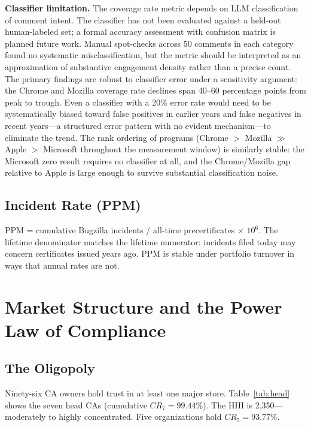 \documentclass[10pt,twocolumn,letterpaper]{article}
\begin{document}
\noindent\textbf{Classifier limitation.} The coverage rate metric
depends on LLM classification of comment intent. The classifier has
not been evaluated against a held-out human-labeled set; a formal
accuracy assessment with confusion matrix is planned future work.
Manual spot-checks across 50 comments in each category found no
systematic misclassification, but the metric should be interpreted
as an approximation of substantive engagement density rather than
a precise count. The primary findings are robust to classifier
error under a sensitivity argument: the Chrome and Mozilla coverage
rate declines span 40--60 percentage points from peak to trough.
Even a classifier with a 20\% error rate would need to be
systematically biased toward false positives in earlier years and
false negatives in recent years---a structured error pattern with
no evident mechanism---to eliminate the trend. The rank ordering
of programs (Chrome $>$ Mozilla $\gg$ Apple $>$ Microsoft throughout
the measurement window) is similarly stable: the Microsoft zero
result requires no classifier at all, and the Chrome/Mozilla gap
relative to Apple is large enough to survive substantial
classification noise.

\subsection{Incident Rate (PPM)}
PPM = cumulative Bugzilla incidents / all-time precertificates
$\times$ $10^6$. The lifetime denominator matches the lifetime numerator:
incidents filed today may concern certificates issued years ago. PPM
is stable under portfolio turnover in ways that annual rates are not.

\section{Market Structure and the Power Law of Compliance}
\label{sec:market}

\subsection{The Oligopoly}
Ninety-six CA owners hold trust in at least one major store.
Table~\ref{tab:head} shows the seven head CAs (cumulative $CR_7 = 99.44\%$).
The HHI is 2,350---moderately to highly concentrated. Five organizations
hold $CR_5 = 93.77\%$.
\end{document}
